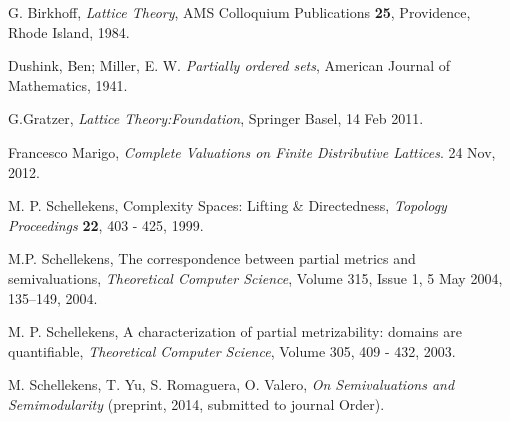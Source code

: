 \documentclass{article}
\begin{document}
\begin{thebibliography}{fi99}

 G. Birkhoff, {\it Lattice Theory}, AMS Colloquium Publications {\bf 25}, Providence, Rhode Island, 1984. 

 Dushink, Ben; Miller, E. W. {\it Partially ordered sets}, American Journal of Mathematics, 1941.

 G.Gratzer, {\it Lattice Theory:Foundation}, 
Springer Basel, 14 Feb 2011.

 Francesco Marigo, {\it Complete Valuations on Finite Distributive Lattices}. 24 Nov, 2012.

 M. P. Schellekens, Complexity Spaces: Lifting \& Directedness, {\it Topology Proceedings} {\bf 22}, 403 - 425, 1999. 

 M.P. Schellekens, The correspondence between partial metrics and semivaluations, {\it Theoretical Computer Science}, Volume 315, Issue 1, 5 May 2004, 135–149, 2004. 

 M. P. Schellekens, A characterization of partial metrizability:
domains are quantifiable,  {\it Theoretical Computer Science}, Volume 305, 409 - 432, 2003. 

 M. Schellekens, T. Yu, S. Romaguera, O. Valero, {\it On Semivaluations and Semimodularity} (preprint, 2014, submitted to journal Order).

\end{thebibliography}
\end{document}
